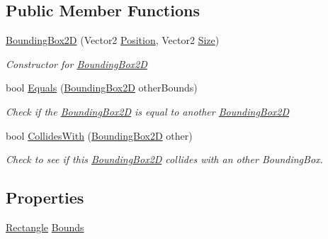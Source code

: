 \subsection*{Public Member Functions}
\begin{DoxyCompactItemize}
\item 
\hyperlink{class_athena_engine_1_1_framework_1_1_primatives_1_1_bounding_box2_d_a5e2010f2bc05fdab5248547cf7585960}{Bounding\-Box2\-D} (Vector2 \hyperlink{class_athena_engine_1_1_framework_1_1_primatives_1_1_entity_af9ff3668f77796ab35a5f8c4b1640813}{Position}, Vector2 \hyperlink{class_athena_engine_1_1_framework_1_1_primatives_1_1_entity_ab97b4ce403d33c60d7613d4ac46ce523}{Size})
\begin{DoxyCompactList}\small\item\em Constructor for \hyperlink{class_athena_engine_1_1_framework_1_1_primatives_1_1_bounding_box2_d}{Bounding\-Box2\-D} \end{DoxyCompactList}\item 
bool \hyperlink{class_athena_engine_1_1_framework_1_1_primatives_1_1_bounding_box2_d_a4daf6b7c5610a3af7a381c6dbba79cfb}{Equals} (\hyperlink{class_athena_engine_1_1_framework_1_1_primatives_1_1_bounding_box2_d}{Bounding\-Box2\-D} other\-Bounds)
\begin{DoxyCompactList}\small\item\em Check if the \hyperlink{class_athena_engine_1_1_framework_1_1_primatives_1_1_bounding_box2_d}{Bounding\-Box2\-D} is equal to another \hyperlink{class_athena_engine_1_1_framework_1_1_primatives_1_1_bounding_box2_d}{Bounding\-Box2\-D} \end{DoxyCompactList}\item 
bool \hyperlink{class_athena_engine_1_1_framework_1_1_primatives_1_1_bounding_box2_d_a8d373f29991909a07504bb3f46683373}{Collides\-With} (\hyperlink{class_athena_engine_1_1_framework_1_1_primatives_1_1_bounding_box2_d}{Bounding\-Box2\-D} other)
\begin{DoxyCompactList}\small\item\em Check to see if this \hyperlink{class_athena_engine_1_1_framework_1_1_primatives_1_1_bounding_box2_d}{Bounding\-Box2\-D} collides with an other Bounding\-Box. \end{DoxyCompactList}\end{DoxyCompactItemize}
\subsection*{Properties}
\begin{DoxyCompactItemize}
\item 
\hyperlink{class_athena_engine_1_1_framework_1_1_primatives_1_1_entity_a7d7668b0626f6b13a6926fea2ce06750}{Rectangle} \hyperlink{class_athena_engine_1_1_framework_1_1_primatives_1_1_bounding_box2_d_aba2448ddc56b8e7857585f11f1e33b51}{Bounds}
\end{DoxyCompactItemize}
